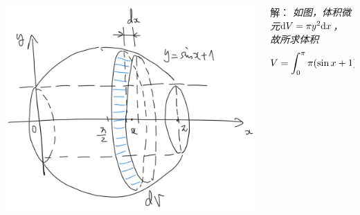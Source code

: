 \begin{frame}
	\linespread{1.5}
	\pause
	
	
	\begin{columns}
		\begin{column}{.5\textwidth}
			\begin{center}
				\includegraphics[width=.9\textwidth]{./images/ch6/sinx1cs.jpg}
			\end{center}		
		\end{column}
		\begin{column}{.5\textwidth}
			\small 解：\it
			如图，体积微元$\mathrm{d} V=\pi y^2\mathrm{d} x$，	故所求体积
			$$
				V=\displaystyle\int_0^{\pi}\pi(\sin x+1)^2\mathrm{d} x=\displaystyle\frac{\,{3}\,}{\,{2}\,}\pi^2.
			$$
		\end{column}
	\end{columns}
\end{frame}

